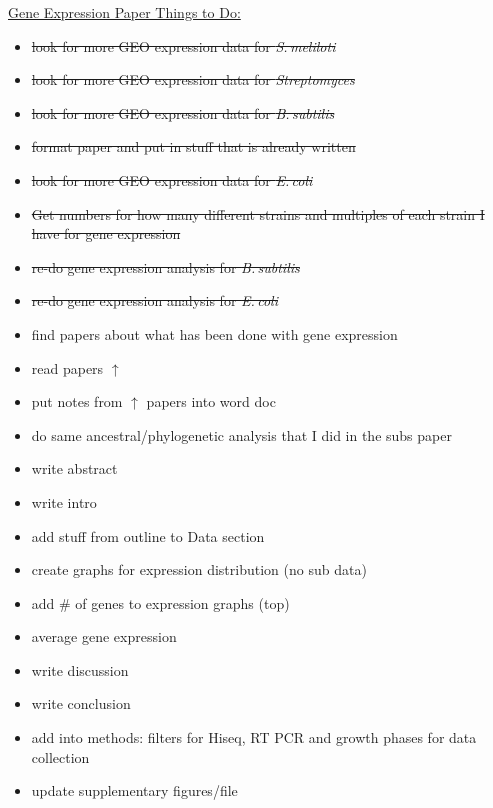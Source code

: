 \documentclass[12pt]{article}
\newcommand{\smel}{\textit{S.\,meliloti}\xspace}
\newcommand{\strep}{\textit{Streptomyces}\xspace}
\newcommand{\bass}{\textit{B.\,subtilis}\xspace}
\newcommand{\ecol}{\textit{E.\,coli}\xspace}
\begin{document}
\underline{Gene Expression Paper Things to Do:}
\begin{itemize}
	
	\item \sout{look for more GEO expression data for \smel}
	
	\item \sout{look for more GEO expression data for \strep}
	
	\item \sout{look for more GEO expression data for \bass}
	
	\item \sout{format paper and put in stuff that is already written}
	
	\item \sout{look for more GEO expression data for \ecol}
	
	\item \sout{Get numbers for how many different strains and multiples of each strain I have for gene expression}
	
	\item \sout{re-do gene expression analysis for \bass}
	
	\item \sout{re-do gene expression analysis for \ecol}
	
	\item find papers about what has been done with gene expression
	
	\item read papers $\uparrow$
	
	\item put notes from $\uparrow$ papers into word doc
	
	\item do same ancestral/phylogenetic analysis that I did in the subs paper 
	
	\item write abstract
	
	\item write intro
	
	\item add stuff from outline to Data section
	
	\item create graphs for expression distribution (no sub data)
	
	\item add \# of genes to expression graphs (top)
	
	\item average gene expression
	
	\item write discussion
	
	\item write conclusion
	
	\item add into methods: filters for Hiseq, RT PCR and growth phases for data collection
	
	\item update supplementary figures/file
	
\end{itemize}
\end{document}
